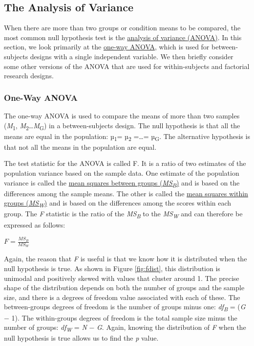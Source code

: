 \documentclass[
]{krantz}
\begin{document}
\hypertarget{the-analysis-of-variance}{%
\subsection*{The Analysis of Variance}\label{the-analysis-of-variance}}


When there are more than two groups or condition means to be compared, the most common null hypothesis test is the \protect\hyperlink{analysis-of-variance-anova}{analysis of variance (ANOVA)}. In this section, we look primarily at the \protect\hyperlink{one-way-anova-1}{one-way ANOVA}, which is used for between-subjects designs with a single independent variable. We then briefly consider some other versions of the ANOVA that are used for within-subjects and factorial research designs.

\hypertarget{one-way-anova}{%
\subsubsection*{One-Way ANOVA}\label{one-way-anova}}


The one-way ANOVA is used to compare the means of more than two samples (\emph{M}\textsubscript{1}, \emph{M}\textsubscript{2}\ldots{}\emph{M}\textsubscript{G}) in a between-subjects design. The null hypothesis is that all the means are equal in the population: µ\textsubscript{1}= µ\textsubscript{2} =\ldots= µ\textsubscript{G}. The alternative hypothesis is that not all the means in the population are equal.

The test statistic for the ANOVA is called F. It is a ratio of two estimates of the population variance based on the sample data. One estimate of the population variance is called the \protect\hyperlink{mean-squares-between-groups-msb}{mean squares between groups (\emph{MS\textsubscript{B}})} and is based on the differences among the sample means. The other is called the \protect\hyperlink{mean-squares-within-groups-msw}{mean squares within groups (\emph{MS\textsubscript{W}})} and is based on the differences among the scores within each group. The \emph{F} statistic is the ratio of the \emph{MS\textsubscript{B}} to the \emph{MS\textsubscript{W}} and can therefore be expressed as follows:

\(F=\frac{MS_B}{MS_W}\)

Again, the reason that \emph{F} is useful is that we know how it is distributed when the null hypothesis is true. As shown in Figure \ref{fig:fdist}, this distribution is unimodal and positively skewed with values that cluster around 1. The precise shape of the distribution depends on both the number of groups and the sample size, and there is a degrees of freedom value associated with each of these. The between-groups degrees of freedom is the number of groups minus one: \emph{df\textsubscript{B}} = (\emph{G} − 1). The within-groups degrees of freedom is the total sample size minus the number of groups: \emph{df\textsubscript{W}} = \emph{N} − \emph{G}. Again, knowing the distribution of \emph{F} when the null hypothesis is true allows us to find the \emph{p} value.
\end{document}
